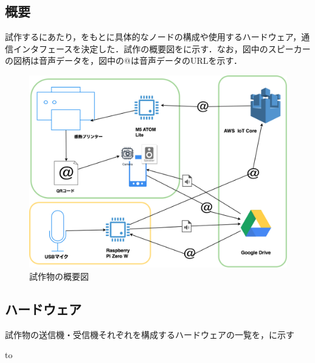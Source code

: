 \documentclass[submit,techrep,noauthor]{ipsj}
\begin{document}
\subsection{概要}
試作するにあたり，をもとに具体的なノードの構成や使用するハードウェア，通信インタフェースを決定した．試作の概要図をに示す．なお，図中のスピーカーの図柄は音声データを，図中の@は音声データのURLを示す．
\begin{figure}[tb]
\includegraphics[scale=0.2,bb= 0 0 2000 1000]{image/proto_drawio.png}
\caption{試作物の概要図}
\label{fig:proto-overview}
\end{figure}

\subsection{ハードウェア}
試作物の送信機・受信機それぞれを構成するハードウェアの一覧を，に示す

\begin{table}[tb] 
\caption{試作物のハードウェア一覧} 
\label{tab:proto-hardwares}
\hbox to
\end{table}
\end{document}
